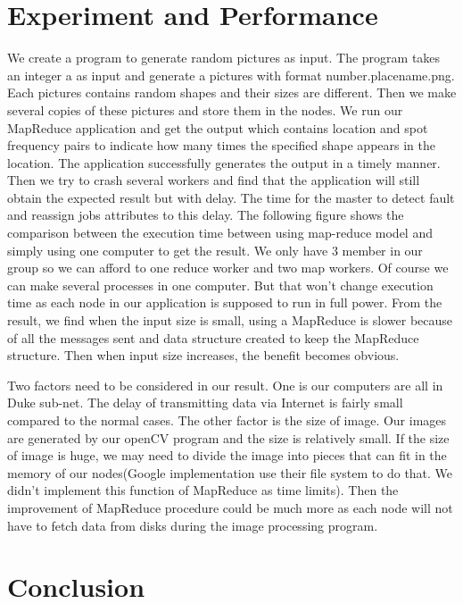 \documentclass[12pt]{article}
\begin{document}
\section{Experiment and Performance }

We create a program to generate random pictures as input. The program takes an integer a as input and generate a pictures with format number.placename.png.  Each pictures contains random shapes and their sizes are different. Then we make several copies of these pictures and store them in the nodes. We run our MapReduce application and get the output which contains location and spot frequency pairs to indicate how many times the specified shape appears in the location. The application successfully generates the output in a timely manner. Then we try to crash several workers and find that the application will still obtain the expected result but with delay. The time for the master to detect fault and reassign jobs attributes to this delay. The following figure shows the comparison between the execution time between using map-reduce model and simply using one computer to get the result. We only have 3 member in our group so we can afford to one reduce worker and two map workers. Of course we can make several processes in one computer. But that won't change execution time as each node in our application is supposed to run in full power. From the result, we find when the input size is small,  using a MapReduce is slower because of all the messages sent and data structure created to keep the MapReduce structure. Then when input size increases, the benefit becomes obvious. 

Two factors need to be considered in our result. One is our computers are all in Duke sub-net. The delay of transmitting data via Internet is fairly small compared to the normal cases. The other factor is the size of image. Our images are generated by our openCV program and the size is relatively small. If the size of image is huge, we may need to divide the image into pieces that can fit in the memory of our nodes(Google implementation use their file system to do that. We didn't implement this function of MapReduce as time limits). Then the improvement of MapReduce procedure could be much more as each node will not have to fetch data from disks during the image processing program.       
  
\section {Conclusion}
\end{document}
